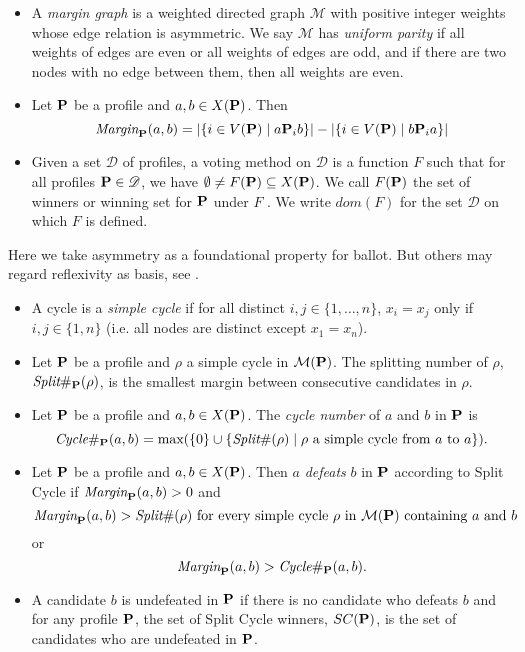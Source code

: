 \begin{definition}
\begin{itemize}
        \item A \emph{margin graph} is a weighted directed graph $\mathcal{M}$ with positive integer weights whose edge relation is asymmetric. We say $\mathcal{M}$ has \emph{uniform parity} if all weights of edges are even or all weights of edges are odd, and if there are two nodes with no edge between them, then all weights are even.
        \item Let $\mathbf{P}$ be a profile and $a,b \in X(\mathbf{P})$. Then 
        \[\textit{Margin}_{\mathbf{P}} (a,b) = |\{i \in V(\mathbf{P})\;|\; a \mathbf{P}_i b\}| - |\{i \in V(\mathbf{P})\;|\; b \mathbf{P}_i a\}|\]
        \item Given a set $\mathscr{D}$ of profiles, a voting method on $\mathscr{D}$ is a function $F$ such that for all profiles $\mathbf{P} \in \mathscr{D}$, we have $\emptyset \neq F(\mathbf{P}) \subseteq X(\mathbf{P})$. We call $F(\mathbf{P})$ the set of winners or winning set for $\mathbf{P}$ under $F$ . We write $dom(F )$ for the set $\mathscr{D}$ on which $F$ is defined.
    \end{itemize}
\end{definition}

\begin{remark}
    Here we take asymmetry as a foundational property for ballot. But others may regard reflexivity as basis, see \textcite{Heitzig2002}.
\end{remark}

\begin{definition}
    \begin{itemize}
        \item A cycle is a \emph{simple cycle} if for all distinct $i,j \in \{1,\dots,n\}$, $x_i = x_j$ only if $i,j \in \{1,n\}$ (i.e. all nodes are distinct except $x_1 = x_n$).
        \item Let $\mathbf{P}$ be a profile and $\rho$ a simple cycle in $\mathcal{M}(\mathbf{P})$. The splitting number of $\rho$, $\textit{Split}\#_{\mathbf{P}}(\rho)$, is the smallest margin between consecutive candidates in $\rho$.
        \item Let $\mathbf{P}$ be a profile and $a, b \in X(\mathbf{P})$. The \emph{cycle number} of $a$ and $b$ in $\mathbf{P}$ is
        \[\textit{Cycle}\#_{\mathbf{P}} (a,b) = \mbox{max}(\{0\} \cup \{\textit{Split}\#(\rho)\;|\;\rho \mbox{ a simple cycle from } a \mbox{ to } a\}).\]
        \item Let $\mathbf{P}$ be a profile and $a,b \in X(\mathbf{P})$. Then $a$ \emph{defeats} $b$ in $\mathbf{P}$ according to Split Cycle if $\textit{Margin}_{\mathbf{P}}(a,b) > 0$ and 
        \[\Margin_\profile(a,b) > \splitnum(\rho)\ \mbox{for every simple cycle}\ \rho\ \mbox{in}\ \mathcal{M}(\profile) \mbox{ containing } a \mbox{ and } b\]
        or
        \[\textit{Margin}_{\mathbf{P}}(a,b) > \textit{Cycle}\#_{\mathbf{P}} (a,b).\]
        \item A candidate $b$ is undefeated in $\mathbf{P}$ if there is no candidate who defeats $b$ and for any profile $\mathbf{P}$, the set of Split Cycle winners, $SC(\mathbf{P})$, is the set of candidates who are undefeated in $\mathbf{P}$.
    \end{itemize}
\end{definition}

